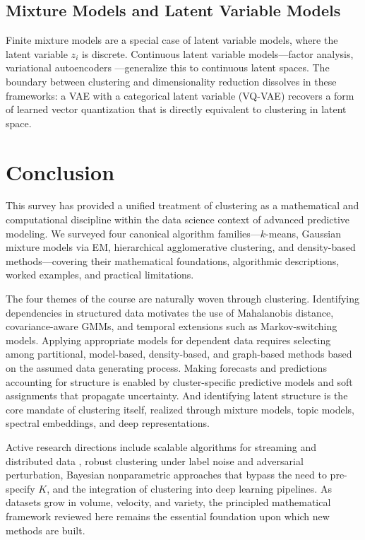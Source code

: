 \documentclass[conference]{IEEEtran}
\begin{document}
\subsection{Mixture Models and Latent Variable Models}

Finite mixture models are a special case of latent variable models, where the latent variable $z_i$ is discrete. Continuous latent variable models---factor analysis, variational autoencoders \cite{kingma2013auto}---generalize this to continuous latent spaces. The boundary between clustering and dimensionality reduction dissolves in these frameworks: a VAE with a categorical latent variable (VQ-VAE) recovers a form of learned vector quantization that is directly equivalent to clustering in latent space.

\section{Conclusion}
\label{sec:conclusion}

This survey has provided a unified treatment of clustering as a mathematical and computational discipline within the data science context of advanced predictive modeling. We surveyed four canonical algorithm families---$k$-means, Gaussian mixture models via EM, hierarchical agglomerative clustering, and density-based methods---covering their mathematical foundations, algorithmic descriptions, worked examples, and practical limitations.

The four themes of the course are naturally woven through clustering. Identifying dependencies in structured data motivates the use of Mahalanobis distance, covariance-aware GMMs, and temporal extensions such as Markov-switching models. Applying appropriate models for dependent data requires selecting among partitional, model-based, density-based, and graph-based methods based on the assumed data generating process. Making forecasts and predictions accounting for structure is enabled by cluster-specific predictive models and soft assignments that propagate uncertainty. And identifying latent structure is the core mandate of clustering itself, realized through mixture models, topic models, spectral embeddings, and deep representations.

Active research directions include scalable algorithms for streaming and distributed data \cite{sculley2010web}, robust clustering under label noise and adversarial perturbation, Bayesian nonparametric approaches that bypass the need to pre-specify $K$, and the integration of clustering into deep learning pipelines. As datasets grow in volume, velocity, and variety, the principled mathematical framework reviewed here remains the essential foundation upon which new methods are built.
\end{document}

